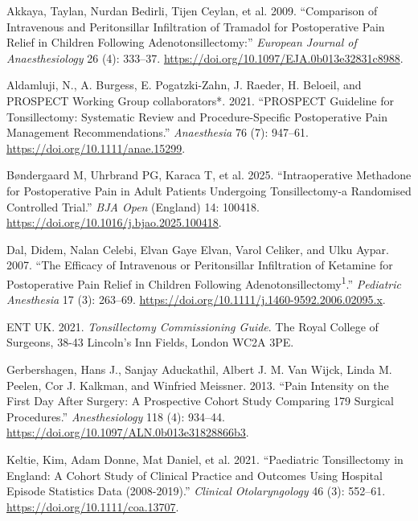 \documentclass[
  letterpaper,
  DIV=11,
  numbers=noendperiod]{scrreprt}
\newlength{\cslhangindent}
\newenvironment{CSLReferences}[2] %
 {\begin{list}{}{%
  \setlength{\itemindent}{0pt}
  \setlength{\leftmargin}{0pt}
  \setlength{\parsep}{0pt}
  \ifodd #1
   \setlength{\leftmargin}{\cslhangindent}
   \setlength{\itemindent}{-1\cslhangindent}
  \fi
  \setlength{\itemsep}{#2\baselineskip}}}
 {\end{list}}
\begin{document}
\protect{}\label{refs}
\begin{CSLReferences}{1}{1}
Akkaya, Taylan, Nurdan Bedirli, Tijen Ceylan, et al. 2009. {``Comparison
of Intravenous and Peritonsillar Infiltration of Tramadol for
Postoperative Pain Relief in Children Following Adenotonsillectomy:''}
\emph{European Journal of Anaesthesiology} 26 (4): 333--37.
\url{https://doi.org/10.1097/EJA.0b013e32831c8988}.

Aldamluji, N., A. Burgess, E. Pogatzki-Zahn, J. Raeder, H. Beloeil, and
PROSPECT Working Group collaborators*. 2021. {``{PROSPECT} Guideline for
Tonsillectomy: Systematic Review and Procedure-Specific Postoperative
Pain Management Recommendations.''} \emph{Anaesthesia} 76 (7): 947--61.
\url{https://doi.org/10.1111/anae.15299}.

Bøndergaard M, Uhrbrand PG, Karaca T, et al. 2025. {``Intraoperative
Methadone for Postoperative Pain in Adult Patients Undergoing
Tonsillectomy-a Randomised Controlled Trial.''} \emph{BJA Open}
(England) 14: 100418. \url{https://doi.org/10.1016/j.bjao.2025.100418}.

Dal, Didem, Nalan Celebi, Elvan Gaye Elvan, Varol Celiker, and Ulku
Aypar. 2007. {``The Efficacy of Intravenous or Peritonsillar
Infiltration of Ketamine for Postoperative Pain Relief in Children
Following Adenotonsillectomy{\textsuperscript{1}}.''} \emph{Pediatric
Anesthesia} 17 (3): 263--69.
\url{https://doi.org/10.1111/j.1460-9592.2006.02095.x}.

ENT UK. 2021. \emph{Tonsillectomy Commissioning Guide}. The Royal
College of Surgeons, 38-43 Lincoln's Inn Fields, London WC2A 3PE.

Gerbershagen, Hans J., Sanjay Aduckathil, Albert J. M. Van Wijck, Linda
M. Peelen, Cor J. Kalkman, and Winfried Meissner. 2013. {``Pain
{Intensity} on the {First Day} After {Surgery}: {A Prospective Cohort
Study Comparing} 179 {Surgical Procedures}.''} \emph{Anesthesiology} 118
(4): 934--44. \url{https://doi.org/10.1097/ALN.0b013e31828866b3}.

Keltie, Kim, Adam Donne, Mat Daniel, et al. 2021. {``Paediatric
Tonsillectomy in {England}: {A} Cohort Study of Clinical Practice and
Outcomes Using {Hospital Episode Statistics} Data (2008-2019).''}
\emph{Clinical Otolaryngology} 46 (3): 552--61.
\url{https://doi.org/10.1111/coa.13707}.


\end{CSLReferences}
\end{document}
